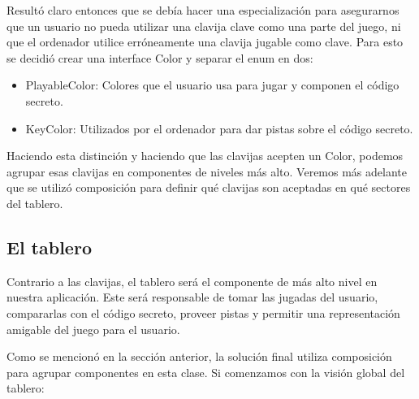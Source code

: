 \documentclass[a4paper,titlepage]{article}
\begin{document}
Resultó claro entonces que se debía hacer una especialización para asegurarnos
que un usuario no pueda utilizar una clavija clave como una parte del juego, ni
que el ordenador utilice erróneamente una clavija jugable como clave. Para esto
se decidió crear una interface Color y separar el enum en dos:
\begin{itemize}
    \item PlayableColor: Colores que el usuario usa para jugar y componen el
        código secreto.
    \item KeyColor: Utilizados por el ordenador para dar pistas sobre el
        código secreto.
\end{itemize}

Haciendo esta distinción y haciendo que las clavijas acepten un Color, podemos
agrupar esas clavijas en componentes de niveles más alto. Veremos más adelante
que se utilizó composición para definir qué clavijas son aceptadas en qué
sectores del tablero.

\subsection{El tablero}

Contrario a las clavijas, el tablero será el componente de más alto nivel en
nuestra aplicación. Este será responsable de tomar las jugadas del usuario,
compararlas con el código secreto, proveer pistas y permitir una representación
amigable del juego para el usuario.

Como se mencionó en la sección anterior, la solución final utiliza composición
para agrupar componentes en esta clase. Si comenzamos con la visión global del
tablero:
\end{document}

